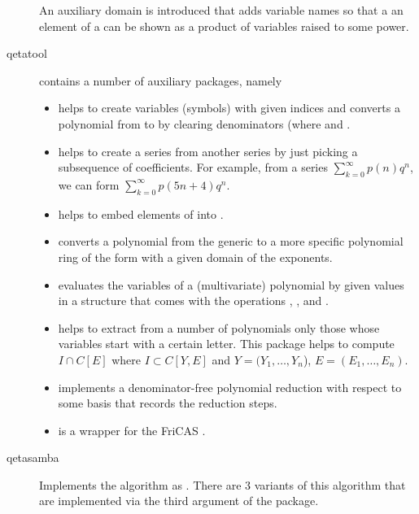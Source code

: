 \documentclass{article}
\begin{document}
\begin{description}
  An auxiliary domain is introduced that adds variable names so that a
  an element of a  can be shown as a product
  of variables raised to some power.

\item[qetatool] contains a number of auxiliary packages, namely
  \begin{itemize}
  \item {} helps to create variables (symbols) with
    given indices and converts a polynomial from
     to 
    by clearing denominators (where  and
    .
  \item {} helps to create a series from another
    series by just picking a subsequence of coefficients. For example,
    from a series $\sum_{k=0}^\infty p(n)q^n$, we can form
    $\sum_{k=0}^\infty p(5n+4)q^n$.
  \item {} helps to embed elements of
     into .
  \item {} converts a polynomial from the
    generic  to a more specific polynomial ring of
    the form  with a given domain of the
    exponents.
  \item {} evaluates the variables of a
    (multivariate) polynomial by given values in a structure that
    comes with the operations \code{+}, \code{*}, and \code{^}.
  \item {} helps to extract from a number of
    polynomials only those whose variables start with a certain
    letter.
    This package helps to compute $I\cap C[E]$ where
    $I \subset C[Y,E]$ and $Y=(Y_1,\ldots,Y_n$),
    $E=(E_1,\ldots, E_n)$.
  \item {} implements a
    denominator-free polynomial reduction with respect to some basis
    that records the reduction steps.
  \item {} is a wrapper for the FriCAS
    .
  \end{itemize}

\item[qetasamba] Implements the \algoSamba{} algorithm as
  .
  There are 3 variants of this algorithm that are implemented via the
  third argument of the  package.


\end{description}
\end{document}
